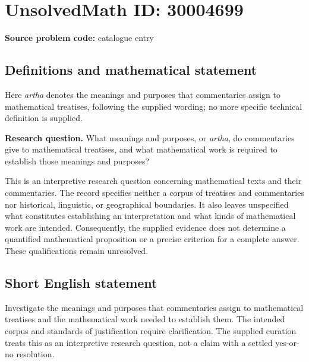\documentclass[11pt]{article}
\begin{document}
\section*{UnsolvedMath ID: 30004699}
\textbf{Source problem code:} catalogue entry
\subsection{Definitions and mathematical statement}
Here \emph{artha} denotes the meanings and purposes that commentaries assign to mathematical treatises, following the supplied wording; no more specific technical definition is supplied.

\textbf{Research question.} What meanings and purposes, or \emph{artha}, do commentaries give to mathematical treatises, and what mathematical work is required to establish those meanings and purposes?

This is an interpretive research question concerning mathematical texts and their commentaries. The record specifies neither a corpus of treatises and commentaries nor historical, linguistic, or geographical boundaries. It also leaves unspecified what constitutes establishing an interpretation and what kinds of mathematical work are intended. Consequently, the supplied evidence does not determine a quantified mathematical proposition or a precise criterion for a complete answer. These qualifications remain unresolved.
\subsection{Short English statement}
Investigate the meanings and purposes that commentaries assign to mathematical treatises and the mathematical work needed to establish them. The intended corpus and standards of justification require clarification. The supplied curation treats this as an interpretive research question, not a claim with a settled yes-or-no resolution.
\end{document}
